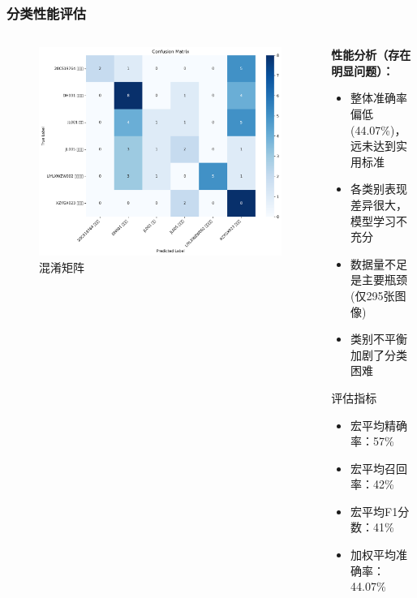 \documentclass[10pt]{beamer}
\begin{document}
\begin{frame}
\frametitle{分类性能评估}
\begin{columns}
\begin{column}{0.5\textwidth}
\begin{figure}
\centering
\includegraphics[width=\textwidth]{confusion_matrix.png}
\caption{混淆矩阵}
\end{figure}
\end{column}

\begin{column}{0.5\textwidth}
\textbf{性能分析（存在明显问题）：}
\begin{itemize}
    \item 整体准确率偏低(44.07\%)，远未达到实用标准
    \item 各类别表现差异很大，模型学习不充分
    \item 数据量不足是主要瓶颈(仅295张图像)
    \item 类别不平衡加剧了分类困难
\end{itemize}

\vspace{0.3cm}
\begin{block}{评估指标}
\small
\begin{itemize}
    \item 宏平均精确率：57\%
    \item 宏平均召回率：42\%
    \item 宏平均F1分数：41\%
    \item 加权平均准确率：44.07\%
\end{itemize}
\end{block}
\end{column}
\end{columns}
\end{frame}
\end{document}
